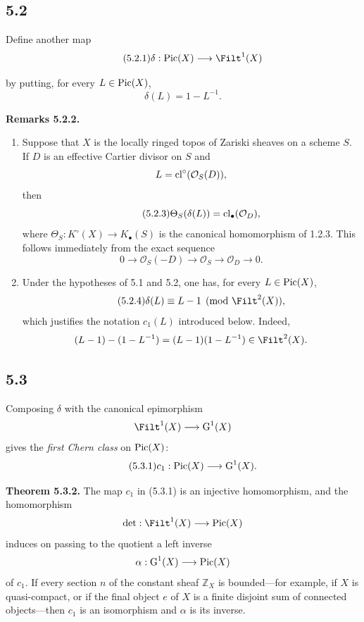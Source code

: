 \subsection*{5.2}
Define another map
\begin{equation}\tag{5.2.1}
\delta:\Pic(X)\longrightarrow\Filt^1(X)
\end{equation}

by putting, for every $L\in\operatorname{Pic}(X)$,
\[
\delta(L)=1-L^{-1}.
\]

\textbf{Remarks 5.2.2.}
\begin{enumerate}[label=\alph*)]
\item Suppose that $X$ is the locally ringed topos of Zariski sheaves on a
scheme $S$. If $D$ is an effective Cartier divisor on $S$ and
\[
L=\operatorname{cl}^\circ(\mathcal O_S(D)),
\]
then
\begin{equation}\tag{5.2.3}
\Theta_S(\delta(L))=\operatorname{cl}_\bullet(\mathcal O_D),
\end{equation}
where $\Theta_S:K^\circ(X)\to K_\bullet(S)$ is the canonical homomorphism of
1.2.3. This follows immediately from the exact sequence
\[
0\longrightarrow\mathcal O_S(-D)\longrightarrow\mathcal O_S
\longrightarrow\mathcal O_D\longrightarrow0.
\]

\item Under the hypotheses of 5.1 and 5.2, one has, for every
$L\in\operatorname{Pic}(X)$,
\begin{equation}\tag{5.2.4}
\delta(L)\equiv L-1\pmod{\Filt^2(X)},
\end{equation}
which justifies the notation $c_1(L)$ introduced below. Indeed,
\[
(L-1)-(1-L^{-1})=(L-1)(1-L^{-1})\in\Filt^2(X).
\]
\end{enumerate}

\subsection*{5.3}
Composing $\delta$ with the canonical epimorphism
\[
\Filt^1(X)\longrightarrow\Gr^1(X)
\]
gives the \emph{first Chern class} on $\operatorname{Pic}(X)$:
\begin{equation}\tag{5.3.1}
c_1:\operatorname{Pic}(X)\longrightarrow\operatorname{G}^1(X).
\end{equation}

\textbf{Theorem 5.3.2.}
The map $c_1$ in (5.3.1) is an injective homomorphism, and the homomorphism
\[
\det:\Filt^1(X)\longrightarrow\Pic(X)
\]
induces on passing to the quotient a left inverse
\[
\alpha:\operatorname{G}^1(X)\longrightarrow\operatorname{Pic}(X)
\]
of $c_1$. If every section $n$ of the constant sheaf $\mathbb Z_X$ is
bounded---for example, if $X$ is quasi-compact, or if the final object $e$ of
$X$ is a finite disjoint sum of connected objects---then $c_1$ is an
isomorphism and $\alpha$ is its inverse.

